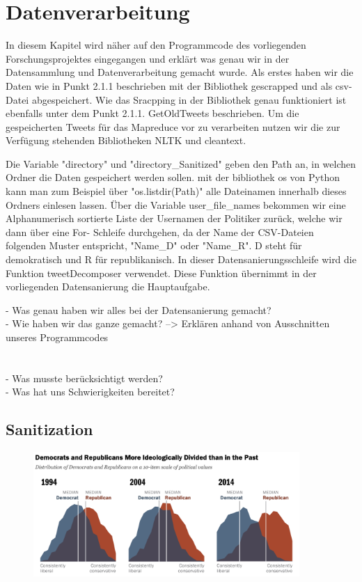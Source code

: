 \section{Datenverarbeitung}
	
	In diesem Kapitel wird näher auf den Programmcode des vorliegenden Forschungsprojektes eingegangen und erklärt was genau wir in der Datensammlung und 
	Datenverarbeitung gemacht wurde. 
	Als erstes haben wir die Daten wie in Punkt 2.1.1 beschrieben mit der Bibliothek gescrapped und als csv-Datei abgespeichert. Wie das Sracpping in der 
	Bibliothek genau funktioniert ist ebenfalls unter dem Punkt 2.1.1. GetOldTweets beschrieben. Um die gespeicherten Tweets für das Mapreduce vor zu 
	verarbeiten nutzen wir die zur Verfügung stehenden Bibliotheken NLTK und cleantext.
	
	
	Die Variable "directory" und "directory_Sanitized" geben den Path an, in welchen Ordner die Daten gespeichert werden sollen. mit der bibliothek os von Python 
	kann man zum Beispiel über "os.listdir(Path)" alle Dateinamen innerhalb dieses Ordners einlesen lassen. 
	Über die Variable user_file_names bekommen wir eine Alphanumerisch sortierte Liste der Usernamen der Politiker zurück, welche wir dann über eine For-
	Schleife durchgehen, da der Name der CSV-Dateien folgenden Muster entspricht, "Name_D" oder "Name_R". D steht für demokratisch und R für 
	republikanisch. In dieser Datensanierungsschleife wird die Funktion tweetDecomposer verwendet. Diese Funktion übernimmt in der vorliegenden Datensanierung die 
	Hauptaufgabe. 
	
	
	- Was genau haben wir alles bei der Datensanierung gemacht?\\
	- Wie haben wir das ganze gemacht? --> Erklären anhand von Ausschnitten unseres Programmcodes\\\\\\
	
	- Was musste berücksichtigt werden?\\
	- Was hat uns Schwierigkeiten bereitet?	
	
	
	\subsection{Sanitization}
	

	
	\begin{figure}[ht]
		\centering
		\includegraphics[width=0.9\textwidth]{images/Kapitel1/PoliticalPolarization}
	\end{figure}
	
	
